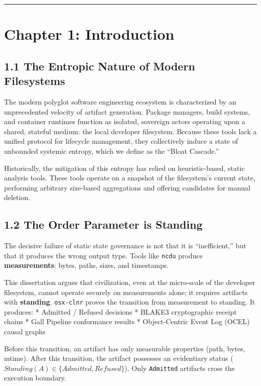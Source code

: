 \documentclass[
  12pt,
]{report}
\begin{document}
\begin{center}\rule{0.5\linewidth}{0.5pt}\end{center}

\chapter{Chapter 1: Introduction}\label{chapter-1-introduction}

\section{1.1 The Entropic Nature of Modern
Filesystems}\label{the-entropic-nature-of-modern-filesystems}

The modern polyglot software engineering ecosystem is characterized by
an unprecedented velocity of artifact generation. Package managers,
build systems, and container runtimes function as isolated, sovereign
actors operating upon a shared, stateful medium: the local developer
filesystem. Because these tools lack a unified protocol for lifecycle
management, they collectively induce a state of unbounded systemic
entropy, which we define as the ``Bloat Cascade.''

Historically, the mitigation of this entropy has relied on
heuristic-based, static analysis tools. These tools operate on a
snapshot of the filesystem's current state, performing arbitrary
size-based aggregations and offering candidates for manual deletion.

\section{1.2 The Order Parameter is
Standing}\label{the-order-parameter-is-standing}

The decisive failure of static state governance is not that it is
``inefficient,'' but that it produces the wrong output type. Tools like
\texttt{ncdu} produce \textbf{measurements}: bytes, paths, sizes, and
timestamps.

This dissertation argues that civilization, even at the micro-scale of
the developer filesystem, cannot operate securely on measurements alone;
it requires artifacts with \textbf{standing}. \texttt{osx-clnr} proves
the transition from measurement to standing. It produces: * Admitted /
Refused decisions * BLAKE3 cryptographic receipt chains * Gall Pipeline
conformance results * Object-Centric Event Log (OCEL) causal graphs

Before this transition, an artifact has only measurable properties
(path, bytes, mtime). After this transition, the artifact possesses an
evidentiary status (\(Standing(A) \in \{Admitted, Refused\}\)). Only
\texttt{Admitted} artifacts cross the execution boundary.
\end{document}

